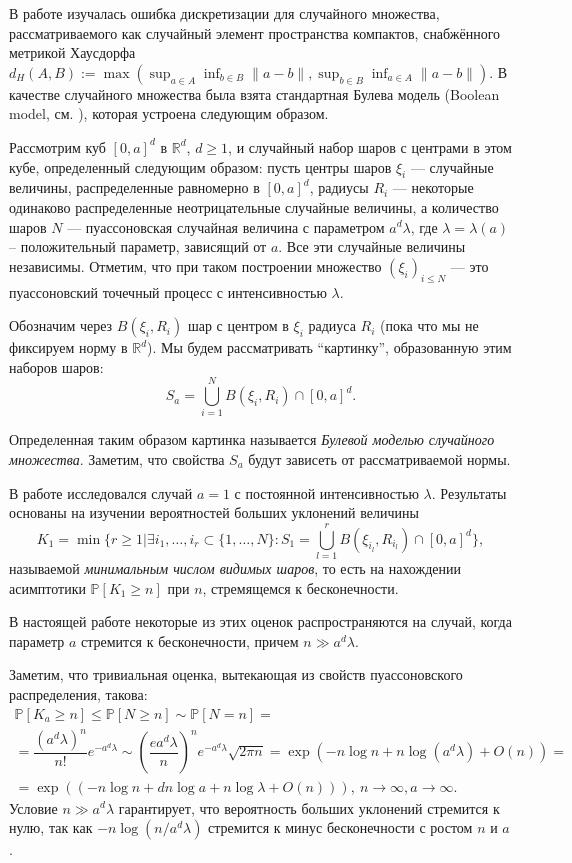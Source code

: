 \documentclass[12pt]{article}
\theoremstyle{plain}
\theoremstyle{definition}
\theoremstyle{remark}
\def\geq{\geqslant}
\def\leq{\leqslant}
\newcommand{\cuplim}{\bigcup\limits}
\newcommand{\R}{\mathbb{R}}
\newcommand{\PP}{\mathbb{P}}
\begin{document}
В работе \cite{AL} изучалась ошибка дискретизации для случайного множества,
рассматриваемого как случайный элемент пространства компактов, снабжённого метрикой Хаусдорфа $d_H(A, B) := \max(\sup_{a\in A}\inf_{b\in B}\|a - b\|, \sup_{b\in B}\inf_{a\in A}\|a - b\|)$.
В качестве случайного множества была взята стандартная Булева модель (Boolean model, см. \cite{CSKM, SW}), которая
устроена следующим образом.

Рассмотрим куб $[0,a]^d$ в $\R^d$, $d \geq 1$, и  случайный набор шаров с центрами в этом кубе, определенный следующим образом: пусть  центры шаров $\xi_i$ ---  случайные величины, распределенные равномерно в $[0,a]^d$, радиусы $R_i$ --- некоторые одинаково распределенные неотрицательные случайные величины, а количество шаров $N$ --- пуассоновская случайная величина с параметром $a^d\lambda$, где $\lambda = \lambda(a)$ -- положительный параметр, зависящий от $a$. Все эти случайные величины независимы. Отметим, что при таком построении множество $(\xi_i)_{i\leq N}$ --- это пуассоновский точечный процесс с интенсивностью $\lambda$.

Обозначим через $B(\xi_i, R_i)$ шар с центром в $\xi_i$ радиуса $R_i$ (пока что мы не фиксируем норму в $\R^d$).
Мы будем рассматривать  ``картинку'', образованную этим наборов шаров:
$$S_a = \cuplim_{i=1}^N B(\xi_i, R_i) \cap [0,a]^d.$$

Определенная таким образом картинка называется {\it Булевой моделью случайного множества}.
Заметим, что свойства $S_a$ будут зависеть от рассматриваемой нормы.

 В работе \cite{AL} исследовался случай $a=1$ с постоянной интенсивностью $\lambda$. Результаты   основаны на изучении вероятностей  больших уклонений величины  $$K_1 = \min \{r \geq 1 | \exists i_1, \ldots , i_r \subset \{1, \ldots , N\} : S_1 = \cuplim_{l=1}^r B(\xi_{i_l}, R_{i_l}) \cap [0,a]^d\},$$
называемой {\it минимальным числом видимых шаров}, то есть на нахождении асимптотики $\PP[K_1 \geq n]$ при $n$, стремящемся к бесконечности. 

В настоящей работе некоторые из этих оценок распространяются на случай, когда параметр $a$ стремится к бесконечности, причем $n \gg a^d\lambda$.

Заметим, что тривиальная оценка, вытекающая из свойств пуассоновского распределения, такова:
\begin{multline*}
    \PP[K_a \geq n] \leq \PP[N\geq n] \sim \PP[N = n] =\\
    = \dfrac{(a^d\lambda)^n}{n!}e^{-a^d\lambda} \sim \left(\dfrac{ea^d\lambda}{n}\right)^ne^{-a^d\lambda}\sqrt{2\pi n} = 
    \exp(-n\log n + n\log (a^d\lambda) + O(n) ) = \\
    =\exp((-n\log n + dn\log a + n\log\lambda + 
    O(n))), \ n\to \infty, a \to\infty.
\end{multline*}{}
Условие $n\gg a^d\lambda$ гарантирует, что вероятность больших уклонений стремится к нулю, так как $-n\log(n/a^d\lambda)$ стремится к минус бесконечности с ростом $n$ и $a$. 
\end{document}
